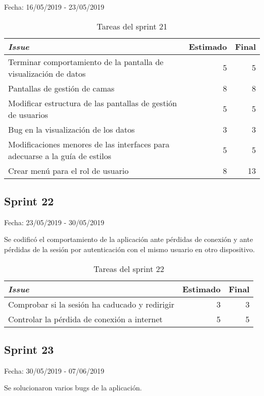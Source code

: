 Fecha: 16/05/2019 - 23/05/2019

\begin{table}[H]
	\begin{tabularx}{\textwidth}{Xrr}
		\toprule \textbf{\textit{Issue}} & \textbf{Estimado} & \textbf{Final}\\
		\toprule
		Terminar comportamiento de la pantalla de visualización de datos & 5 & 5 \\
		Pantallas de gestión de camas & 8 & 8 \\
		Modificar estructura de las pantallas de gestión de usuarios & 5 & 5 \\
		Bug en la visualización de los datos & 3 & 3 \\
		Modificaciones menores de las interfaces para adecuarse a la guía de estilos & 5 & 5 \\
		Crear menú para el rol de usuario & 8 & 13 \\
		\bottomrule
	\end{tabularx}
	\caption{Tareas del sprint 21}
\end{table}

\subsection{Sprint 22}

Fecha: 23/05/2019 - 30/05/2019

Se codificó el comportamiento de la aplicación ante pérdidas de conexión y ante pérdidas de la sesión por autenticación con el mismo usuario en otro dispositivo. 

\begin{table}[H]
	\begin{tabularx}{\textwidth}{Xrr}
		\toprule \textbf{\textit{Issue}} & \textbf{Estimado} & \textbf{Final}\\
		\toprule
		Comprobar si la sesión ha caducado y redirigir & 3 & 3 \\
		Controlar la pérdida de conexión a internet & 5 & 5 \\
		\bottomrule
	\end{tabularx}
	\caption{Tareas del sprint 22}
\end{table}

\subsection{Sprint 23}

Fecha: 30/05/2019 - 07/06/2019

Se solucionaron varios bugs de la aplicación. 

